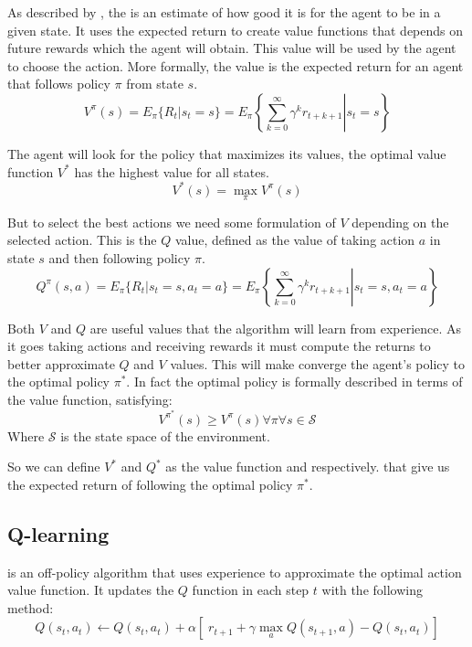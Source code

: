 As described by \citeauthor*[Section~3.7]{sutton1998introduction}, the  is an estimate of how good it is for the agent to be in a given state. It uses the expected return to create value functions that depends on future rewards which the agent will obtain. This value will be used by the agent to choose the action. More formally, the value is the expected return for an agent that follows policy $\pi$ from state $s$.
\begin{equation}
    V^\pi(s) = E_\pi \lbrace R_t | s_t = s \rbrace =
    E_\pi \left\{ \left. \sum_{k=0}^\infty \gamma^kr_{t+k+1} \right| s_t = s \right\}
\end{equation}

The agent will look for the policy that maximizes its values, the optimal value function $V^*$ has the highest value for all states.
\begin{equation}
    V^*(s)=\max_\pi V^\pi(s)
\end{equation}

But to select the best actions we need some formulation of $V$ depending on the selected action. This is the $Q$ value, defined as the value of taking action $a$ in state $s$ and then following policy $\pi$.
\begin{equation}
    Q^\pi(s, a) = E_\pi \lbrace R_t | s_t = s, a_t = a \rbrace =
    E_\pi \left\{ \left. \sum_{k=0}^\infty \gamma^kr_{t+k+1} \right| s_t = s, a_t = a \right\}
\end{equation}

Both $V$ and $Q$ are useful values that the algorithm will learn from experience. As it goes taking actions and receiving rewards it must compute the returns to better approximate $Q$ and $V$ values. This will make converge the agent’s policy to the optimal policy $\pi^*$. In fact the optimal policy is formally described in terms of the value function, satisfying:
\begin{equation}
    V^{\pi^*}(s)\geq V^{\pi}(s) \forall \pi \forall s \in \mathcal{S}
\end{equation}
Where $\mathcal{S}$ is the state space of the environment.

So we can define $V^*$ and $Q^*$ as the value function and  respectively.
that give us the expected return of following the optimal policy $\pi^*$.

\subsection{Q-learning\label{subsec:Qlearn}}
 is an off-policy algorithm that uses experience to approximate the optimal action value function. It updates the $Q$ function in each step $t$ with the following method:
\begin{equation}
    Q(s_t,a_t)\leftarrow Q(s_t,a_t) + \alpha [\;r_{t+1} + \gamma \max_a Q(s_{t+1},a) - Q(s_t,a_t)]
\end{equation}
\citep[Section~6.5]{sutton1998introduction}

